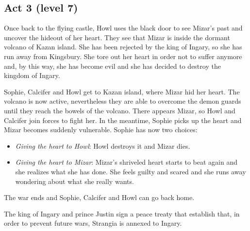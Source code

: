 \subsection*{Act 3 (level 7)}
Once back to the flying castle, Howl uses the black door to see Mizar's past and uncover the hideout of her heart. They see that Mizar is inside the dormant volcano of Kazan island. She has been rejected by the king of Ingary, so she has run away from Kingsbury. She tore out her heart in order not to suffer anymore and, by this way, she has become evil and she has decided to destroy the kingdom of Ingary.

Sophie, Calcifer and Howl get to Kazan island, where Mizar hid her heart. The volcano is now active, nevertheless they are able to overcome the demon guards until they reach the bowels of the volcano. There appears Mizar, so Howl and Calcifer join forces to fight her. In the meantime, Sophie picks up the heart and Mizar becomes suddenly vulnerable. Sophie has now two choices:
\begin{itemize}
\item \textit{Giving the heart to Howl}: Howl destroys it and Mizar dies.
\item \textit{Giving the heart to Mizar}: Mizar's shriveled heart starts to beat again and she realizes what she has done. She feels guilty and scared and she runs away wondering about what she really wants.
\end{itemize} 

The war ends and Sophie, Calcifer and Howl can go back home.

The king of Ingary and prince Justin sign a peace treaty that establish that, in order to prevent future wars, Strangia is annexed to Ingary.
